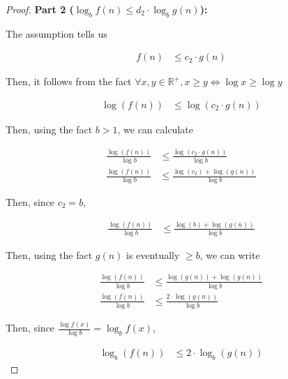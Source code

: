 \documentclass[12pt]{article}
\begin{document}
\begin{enumerate}[a.]
\begin{proof}
        \textbf{Part 2 ($\log_b f(n) \leq d_2 \cdot \log_b g(n)$):}

        \bigskip

        The assumption tells us

        \begin{align}
            f(n) &\leq c_2 \cdot g(n)
        \end{align}

        \bigskip

        Then, it follows from the fact $\forall x,y \in \mathbb{R}^{+}, x \geq y
        \Leftrightarrow \log x \geq \log y$

        \begin{align}
            \log (f(n)) &\leq \log (c_2 \cdot g(n))
        \end{align}

        \bigskip

        Then, using the fact $b > 1$, we can calculate

        \begin{align}
            \frac{\log (f(n))}{\log b} &\leq \frac{\log (c_2 \cdot g(n))}{\log b}\\
            \frac{\log (f(n))}{\log b} &\leq \frac{\log (c_2) + \log (g(n))}{\log b}
        \end{align}

        \bigskip

        Then, since $c_2 = b$,

        \begin{align}
            \frac{\log (f(n))}{\log b} &\leq \frac{\log (b) + \log (g(n))}{\log b}
        \end{align}

        \bigskip

        Then, using the fact $g(n)$ is eventually $\geq b$, we can write

        \begin{align}
            \frac{\log (f(n))}{\log b} &\leq \frac{\log (g(n)) + \log (g(n))}{\log b}\\
            \frac{\log (f(n))}{\log b} &\leq \frac{2 \cdot \log (g(n))}{\log b}
        \end{align}

        \bigskip

        Then, since $\frac{\log f(x)}{\log b} = \log_b f(x)$,

        \begin{align}
            \log_b (f(n)) &\leq 2 \cdot \log_b (g(n))
        \end{align}


\end{proof}
\end{enumerate}
\end{document}
